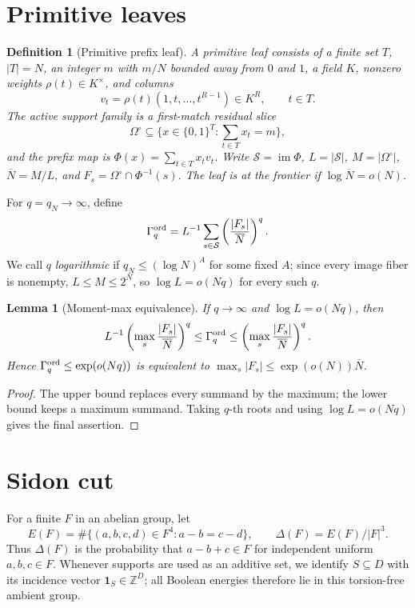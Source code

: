 \documentclass[11pt,a4paper]{amsart}
\numberwithin{equation}{section}
\newtheorem{lemma}[theorem]{Lemma}
\newtheorem{definition}[theorem]{Definition}
\theoremstyle{remark}
\newcommand{\Z}{\mathbb Z}
\newcommand{\Scal}{\mathcal S}
\newcommand{\OmegaC}{\Omega^{\circ}}
\newcommand{\Gord}{\Gamma^{\rm ord}}
\newcommand{\barN}{\overline N}
\begin{document}
\section{Primitive leaves}

\begin{definition}[Primitive prefix leaf]\label{def:primitive-leaf}
A primitive leaf consists of a finite set \(T\), \(|T|=N\), an integer \(m\) with \(m/N\) bounded away from \(0\) and \(1\), a field \(K\), nonzero weights \(\rho(t)\in K^\times\), and columns
\[
        v_t=\rho(t)(1,t,\ldots,t^{R-1})\in K^R,\qquad t\in T.
\]
The active support family is a first-match residual slice
\[
        \OmegaC\subseteq \{x\in\{0,1\}^{T}:\sum_{t\in T}x_t=m\},
\]
and the prefix map is \(\Phi(x)=\sum_{t\in T}x_tv_t\).  Write \(\Scal=\operatorname{im}\Phi\), \(L=|\Scal|\), \(M=|\OmegaC|\), \(\barN=M/L\), and \(F_s=\OmegaC\cap\Phi^{-1}(s)\).  The leaf is at the frontier if \(\log\barN=o(N)\).
\end{definition}

For \(q=q_N\to\infty\), define
\[
        \Gord_q=L^{-1}\sum_{s\in\Scal}\left(\frac{|F_s|}{\barN}\right)^q .
\]
We call \(q\) \emph{logarithmic} if
\(q_N\le(\log N)^A\) for some fixed \(A\); since every image fiber is
nonempty, \(L\le M\le2^N\), so \(\log L=o(Nq)\) for every such \(q\).

\begin{lemma}[Moment-max equivalence]\label{lem:moment-max}
If \(q\to\infty\) and \(\log L=o(Nq)\), then
\[
        L^{-1}\left(\max_s\frac{|F_s|}{\barN}\right)^q
        \le \Gord_q
        \le
        \left(\max_s\frac{|F_s|}{\barN}\right)^q .
\]
Hence \(\Gord_q\le \exp(o(Nq))\) is equivalent to \(\max_s|F_s|\le\exp(o(N))\barN\).
\end{lemma}

\begin{proof}
The upper bound replaces every summand by the maximum; the lower bound keeps a maximum summand.  Taking \(q\)-th roots and using \(\log L=o(Nq)\) gives the final assertion.
\end{proof}

\section{Sidon cut}

For a finite \(F\) in an abelian group, let
\[
        E(F)=\#\{(a,b,c,d)\in F^4:a-b=c-d\},\qquad
        \Delta(F)=E(F)/|F|^3.
\]
Thus \(\Delta(F)\) is the probability that \(a-b+c\in F\) for independent uniform \(a,b,c\in F\).
Whenever supports are used as an additive set, we identify
\(S\subseteq D\) with its incidence vector \(\mathbf1_S\in\Z^D\);
all Boolean energies therefore lie in this torsion-free ambient group.
\end{document}
